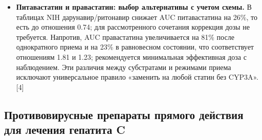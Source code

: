 \documentclass[11pt]{article}
\begin{document}
\begin{itemize}
\item \textbf{Питавастатин и правастатин: выбор альтернативы с учетом схемы.} В таблицах NIH дарунавир/ритонавир снижает AUC питавастатина на 26\%, то есть до отношения 0.74; для рассмотренного сочетания коррекция дозы не требуется. Напротив, AUC правастатина увеличивается на 81\% после однократного приема и на 23\% в равновесном состоянии, что соответствует отношениям 1.81 и 1.23; рекомендуется минимальная эффективная доза с наблюдением. Эти различия между субстратами и режимами приема исключают универсальное правило «заменить на любой статин без CYP3A». [4]
\end{itemize}

\subsection{Противовирусные препараты прямого действия для лечения гепатита C}
\end{document}
